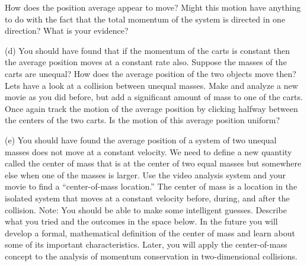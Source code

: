 How does the position average appear to move? Might this motion have anything
to do with the fact that the total momentum of the system is directed in one
direction? What is your evidence?
\vspace{20mm}

(d) You should have found that if the momentum of the carts is constant then
the average position moves at a constant rate also. Suppose the masses of the
carts are unequal? How does the average position of the two objects move then?
Lets have a look at a collision between unequal masses. Make and analyze a new
movie as you did before, but add a significant amount of mass to one of the
carts. Once again track the motion of the average position by clicking halfway
between the centers of the two carts. Is the motion of this average position
uniform?
\vspace{20mm}

(e) You should have found the average position of a system of two unequal masses
does not move at a constant velocity. We need to define a new quantity called
the center of mass that is at the center of two equal masses but somewhere else
when one of the masses is larger. Use the video analysis system and your movie
to find a ``center-of-mass location.'' The center of mass is
a location in the isolated system that moves at a constant velocity before,
during, and after the collision. Note: You should be able to make some intelligent
guesses. Describe what you tried and the outcomes in the space below. In the
future you will develop a formal, mathematical definition of the center of mass
and learn about some of its important characteristics. Later, you will apply
the center-of-mass concept to the analysis of momentum conservation in two-dimensional
collisions.

